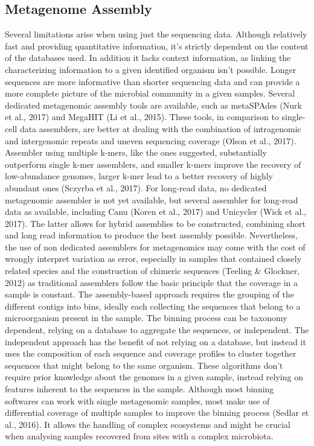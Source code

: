 \subsection{Metagenome Assembly}
Several limitations arise when using just the sequencing data. Although relatively fast and providing quantitative information, it’s strictly dependent on the content of the databases used. In addition it lacks context information, as linking the characterizing information to a given identified organism isn’t possible. 
Longer sequences are more informative than shorter sequencing data and can provide a more complete picture of the microbial community in a given samples. Several dedicated metagenomic assembly tools are available, such as metaSPAdes (Nurk et al., 2017)  and MegaHIT (Li et al., 2015). These tools, in comparison to single-cell data assemblers, are better at dealing with the combination of intragenomic and intergenomic repeats and uneven sequencing coverage (Olson et al., 2017). Assembler using multiple k-mers, like the ones suggested, substantially outperform single k-mer assemblers, and smaller k-mers improve the recovery of low-abundance genomes, larger k-mer lead to a better recovery of highly abundant ones (Sczyrba et al., 2017). 
For long-read data, no dedicated metagenomic assembler is not yet available, but several assembler for long-read data as available, including Canu (Koren et al., 2017) and Unicycler (Wick et al., 2017). The latter allows for hybrid assemblies to be constructed, combining short and long read information to produce the best assembly possible. Nevertheless, the use of non dedicated assemblers for metagenomics may come with the cost of wrongly interpret variation as error, especially in samples that contained closely related species and the construction of chimeric sequences (Teeling & Glockner, 2012) as traditional assemblers follow the basic principle that the coverage in a sample is constant. 
The assembly-based approach requires the grouping of the different contigs into bins, ideally each collecting the sequences that belong to a microorganism present in the sample. The binning process can be taxonomy dependent, relying on a database to aggregate the sequences, or independent. The independent approach has the benefit of not relying on a database, but instead it uses the composition of each sequence and coverage profiles to cluster together sequences that might belong to the same organism. These algorithms don’t require prior knowledge about the genomes in a given sample, instead relying on features inherent to the sequences in the sample. Although most binning softwares can work with single metagenomic samples, most make use of differential coverage of multiple samples to improve the binning process (Sedlar et al., 2016). It allows the handling of complex ecosystems and might be crucial when analysing samples recovered from sites with a complex microbiota. 

